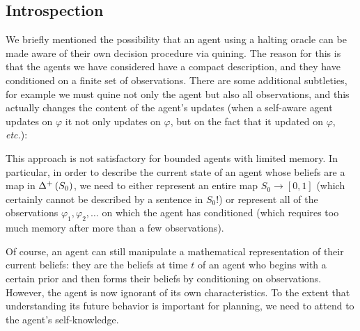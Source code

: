 \documentclass[12pt]{article}
\newtheorem{theorem}{Theorem}
\theoremstyle{definition}
\newcommand{\of}[1]{\left(#1\right)}
\newcommand{\PP}{\mathbb{P}}
\newcommand{\vp}{\varphi}
\begin{document}
\subsection{Introspection}

We briefly mentioned the possibility that an agent using a halting oracle 
can be made aware of their own decision procedure via quining.
The reason for this is that the agents we have considered have
a compact description, and they have conditioned on a finite
set of observations. There are some additional subtleties,
for example we must quine not only the agent but also all observations,
and this actually changes the content of the agent's updates
(when a self-aware agent updates on $\vp$ it not only updates on $\vp$,
but on the fact that it updated on $\vp$, \emph{etc.}):

This approach is not satisfactory for bounded agents with limited memory.
In particular, in order to describe the current state
of an agent whose beliefs are a map in $\Dp{S_0}$,
we need to either represent an entire map $S_0 \rightarrow [0, 1]$
(which certainly cannot be described by a sentence in $S_0$!)
or represent all of the observations $\vp_1, \vp_2, \ldots$ on which
the agent has conditioned (which requires too much memory after more
than a few observations).

Of course, an agent can still manipulate a mathematical representation of their
current beliefs:
they are the beliefs at time $t$ of an agent who begins with a certain prior
and then forms their beliefs by conditioning on observations.
However, the agent is now ignorant of its own characteristics.
To the extent that understanding its future behavior is important for planning,
we need to attend to the agent's self-knowledge.
\end{document}

